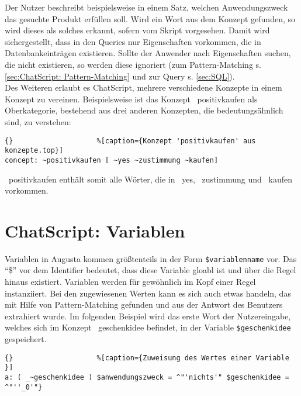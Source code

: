 Der Nutzer beschreibt beispielsweise in einem Satz, welchen Anwendungszweck das gesuchte Produkt erfüllen soll. Wird ein Wort aus dem Konzept gefunden, so wird dieses als solches erkannt, \textcolor[rgb]{1,0.41,0.13}{sofern vom Skript vorgesehen.} Damit wird sichergestellt, dass in den Queries nur Eigenschaften vorkommen, die in Datenbankeinträgen existieren. Sollte der Anwender nach Eigenschaften suchen, die nicht existieren, so werden diese ignoriert (zum Pattern-Matching s. \ref{sec:ChatScript: Pattern-Matching} und zur Query s. \ref{sec:SQL}). \\

Des Weiteren erlaubt es ChatScript, mehrere verschiedene Konzepte in einem Konzept zu vereinen. Beispielsweise ist das Konzept ~positivkaufen als Oberkategorie, bestehend aus drei anderen Konzepten, die bedeutungsähnlich sind, zu verstehen:

\begin{lstlisting}{}					%[caption={Konzept 'positivkaufen' aus konzepte.top}]
concept: ~positivkaufen [ ~yes ~zustimmung ~kaufen]
\end{lstlisting}

~positivkaufen enthält somit alle Wörter, die in ~yes, ~zustimmung und ~kaufen vorkommen.\\


\section{ChatScript: Variablen}
\label{sec:ChatScript: Variablen}
Variablen in Augusta kommen größtenteils in der Form \lstinline|$variablenname| vor. Das "`\$"' vor dem Identifier bedeutet, dass diese Variable gloabl ist und über die Regel hinaus existiert. Variablen werden für gewöhnlich im Kopf einer Regel instanziiert. Bei den zugewiesenen Werten kann es sich auch etwas handeln, das mit Hilfe von Pattern-Matching gefunden und aus der Antwort des Benutzers extrahiert wurde. Im folgenden Beispiel wird das erste Wort der Nutzereingabe, welches sich im Konzept ~geschenkidee befindet, in der Variable \lstinline|$geschenkidee| gespeichert. 

\begin{lstlisting}{}					%[caption={Zuweisung des Wertes einer Variable }]
a: ( _~geschenkidee ) $anwendungszweck = ^"'nichts'" $geschenkidee = ^"''_0'"}
\end{lstlisting}

